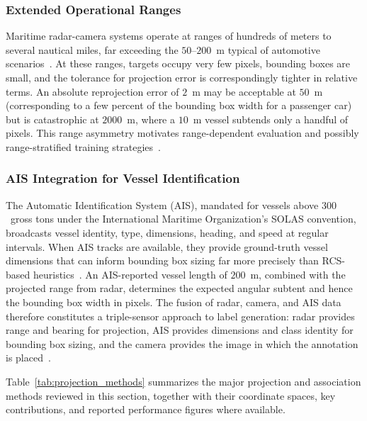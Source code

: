 \subsubsection{Extended Operational Ranges}

Maritime radar-camera systems operate at ranges of hundreds of meters to several nautical miles, far exceeding the $50$--$200$~m typical of automotive scenarios~\cite{xu2024maritime}. At these ranges, targets occupy very few pixels, bounding boxes are small, and the tolerance for projection error is correspondingly tighter in relative terms. An absolute reprojection error of $2$~m may be acceptable at $50$~m (corresponding to a few percent of the bounding box width for a passenger car) but is catastrophic at $2000$~m, where a $10$~m vessel subtends only a handful of pixels. This range asymmetry motivates range-dependent evaluation and possibly range-stratified training strategies~\cite{sengupta2024comprehensive}.

\subsubsection{AIS Integration for Vessel Identification}

The Automatic Identification System (AIS), mandated for vessels above $300$~gross tons under the International Maritime Organization's SOLAS convention, broadcasts vessel identity, type, dimensions, heading, and speed at regular intervals. When AIS tracks are available, they provide ground-truth vessel dimensions that can inform bounding box sizing far more precisely than RCS-based heuristics~\cite{xu2024maritime}. An AIS-reported vessel length of $200$~m, combined with the projected range from radar, determines the expected angular subtent and hence the bounding box width in pixels. The fusion of radar, camera, and AIS data therefore constitutes a triple-sensor approach to label generation: radar provides range and bearing for projection, AIS provides dimensions and class identity for bounding box sizing, and the camera provides the image in which the annotation is placed~\cite{xu2024maritime, patino2021fusion}.

Table~\ref{tab:projection_methods} summarizes the major projection and association methods reviewed in this section, together with their coordinate spaces, key contributions, and reported performance figures where available.

